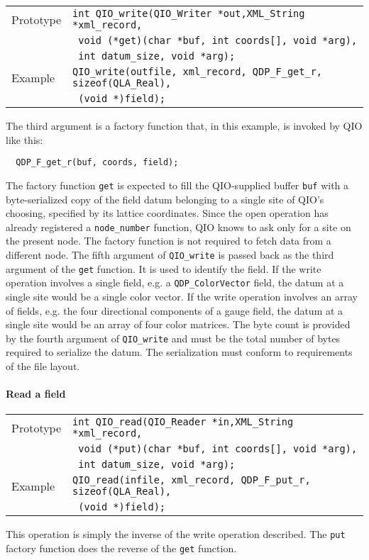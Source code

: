 \documentclass{article}
\newcommand{\QMDhandle}{{\tt XML\_String}}
\begin{document}
\begin{flushleft}
  \begin{tabular}{|l|l|}
  \hline
  Prototype      & \verb|int QIO_write(QIO_Writer *out,|\QMDhandle\verb| *xml_record, |\\
	    & \verb| void (*get)(char *buf, int coords[], void *arg),|\\
            & \verb| int datum_size, void *arg);| \\
\hline
  Example  & \verb|QIO_write(outfile, xml_record, QDP_F_get_r, sizeof(QLA_Real),|\\
           & \verb| (void *)field);|\\
   \hline
 \end{tabular}
\end{flushleft}
%
The third argument is a factory function that, in this example, is
invoked by QIO like this:
%
\begin{verbatim}
  QDP_F_get_r(buf, coords, field);
\end{verbatim}
%
The factory function \verb|get| is expected to fill the QIO-supplied
buffer \verb|buf| with a byte-serialized copy of the field datum
belonging to a single site of QIO's choosing, specified by its lattice
coordinates.  Since the open operation has already registered a
\verb|node_number| function, QIO knows to ask only for a site on the
present node.  The factory function is not required to fetch data from
a different node.  The fifth argument of \verb|QIO_write| is passed
back as the third argument of the \verb|get| function.  It is used to
identify the field.  If the write operation involves a single field,
e.g. a \verb|QDP_ColorVector| field, the datum at a single site would
be a single color vector.  If the write operation involves an array of
fields, e.g. the four directional components of a gauge field, the
datum at a single site would be an array of four color matrices.  The
byte count is provided by the fourth argument of \verb|QIO_write| and
must be the total number of bytes required to serialize the datum.
The serialization must conform to requirements of the file layout.


\paragraph{Read a field}

\begin{flushleft}
  \begin{tabular}{|l|l|}
  \hline
  Prototype      & \verb|int QIO_read(QIO_Reader *in,|\QMDhandle\verb| *xml_record, |\\
	    & \verb| void (*put)(char *buf, int coords[], void *arg), |\\
            & \verb| int datum_size, void *arg);| \\
\hline
  Example  & \verb|QIO_read(infile, xml_record, QDP_F_put_r, sizeof(QLA_Real),|\\
           & \verb| (void *)field);|\\
   \hline
 \end{tabular}
\end{flushleft}
%
This operation is simply the inverse of the write operation described.
The \verb|put| factory function does the reverse of the \verb|get|
function.
\end{document}
